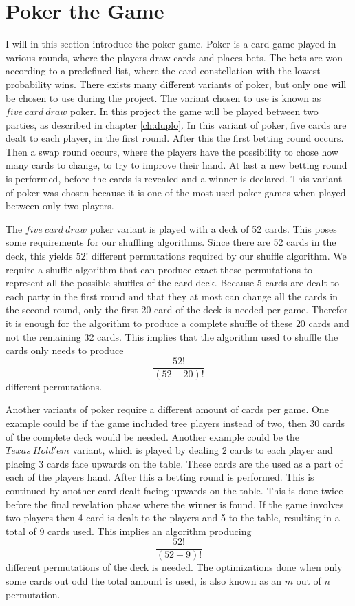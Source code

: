 \documentclass[twoside,11pt,openright]{report}
\begin{document}
\section{Poker the Game}
\label{sec:poker}
I will in this section introduce the poker game. Poker is a card game played in various rounds, where the players draw cards and places bets. The bets are won according to a predefined list, where the card constellation with the lowest probability wins. There exists many different variants of poker, but only one will be chosen to use during the project. The variant chosen to use is known as $five~card~draw$ poker. In this project the game will be played between two parties, as described in chapter \ref{ch:duplo}. In this variant of poker, five cards are dealt to each player, in the first round. After this the first betting round occurs. Then a swap round occurs, where the players have the possibility to chose how many cards to change, to try to improve their hand. At last a new betting round is performed, before the cards is revealed and a winner is declared. This variant of poker was chosen because it is one of the most used poker games when played between only two players.

The $five~card~draw$ poker variant is played with a deck of 52 cards. This poses some requirements for our shuffling algorithms. Since there are 52 cards in the deck, this yields $52!$ different permutations required by our shuffle algorithm. We require a shuffle algorithm that can produce exact these permutations to represent all the possible shuffles of the card deck. Because 5 cards are dealt to each party in the first round and that they at most can change all the cards in the second round, only the first 20 card of the deck is needed per game. Therefor it is enough for the algorithm to produce a complete shuffle of these $20$ cards and not the remaining 32 cards. This implies that the algorithm used to shuffle the cards only needs to produce $$\frac{52!}{(52-20)!}$$ different permutations. 

Another variants of poker require a different amount of cards per game. One example could be if the game included tree players instead of two, then 30 cards of the complete deck would be needed. Another example could be the $Texas~Hold'em$ variant, which is played by dealing $2$ cards to each player and placing $3$ cards face upwards on the table. These cards are the used as a part of each of the players hand. After this a betting round is performed. This is continued by another card dealt facing upwards on the table. This is done twice before the final revelation phase where the winner is found. If the game involves two players then 4 card is dealt to the players and 5 to the table, resulting in a total of 9 cards used. This implies an algorithm producing $$\frac{52!}{(52-9)!}$$ different permutations of the deck is needed. The optimizations done when only some cards out odd the total amount is used, is also known as an $m$ out of $n$ permutation.
\end{document}
